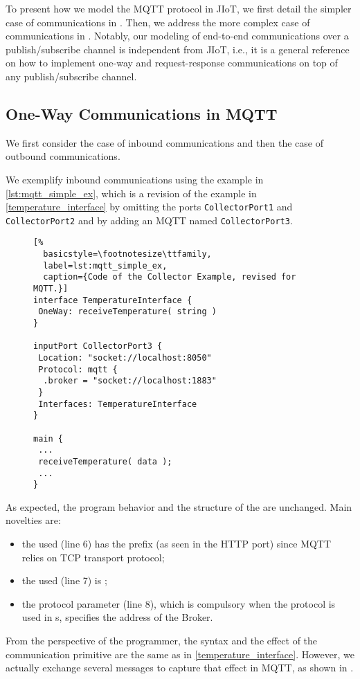 To present how we model the MQTT protocol in JIoT, we first detail the simpler
case of  communications in . Then, we
address the more complex case of  communications in
. Notably, our modeling of end-to-end communications over
a publish/subscribe channel is independent from JIoT, i.e., it is a general
reference on how to implement one-way and request-response communications on
top of any publish/subscribe channel.

\subsection{One-Way Communications in MQTT}
\label{sub:ow_in_mqtt}

We first consider the case of inbound communications and then the case of
outbound communications.

We exemplify  inbound communications using the example in
\cref{lst:mqtt_simple_ex}, which is a revision of the example in
\cref{temperature_interface} by omitting the ports
\texttt{CollectorPort1} and \texttt{CollectorPort2} and
by adding an MQTT  named \texttt{CollectorPort3}.

\begin{figure}[t]
 \begin{lstlisting}[%
  basicstyle=\footnotesize\ttfamily,
  label=lst:mqtt_simple_ex,
  caption={Code of the Collector Example, revised for MQTT.}]
interface TemperatureInterface {
 OneWay: receiveTemperature( string )
}

inputPort CollectorPort3 {
 Location: "socket://localhost:8050"
 Protocol: mqtt {
  .broker = "socket://localhost:1883"
 }
 Interfaces: TemperatureInterface
}

main {
 ...
 receiveTemperature( data );
 ...
}
\end{lstlisting}
\end{figure}

As expected, the program behavior and the structure of the 
are unchanged. Main novelties are:
%
\begin{itemize}
 \item the used  (line 6) has the prefix
        (as seen in the HTTP port) since MQTT relies on TCP
       transport protocol;
 \item the used  (line 7) is ;
 \item the  protocol parameter (line 8), which is
       compulsory when the  protocol is used in s,
       specifies the address of the Broker.
\end{itemize}
%
From the perspective of the programmer, the syntax and the effect of the
communication primitive are the same as in \cref{temperature_interface}.
However, we actually exchange several messages to capture that effect in MQTT,
as shown in .

